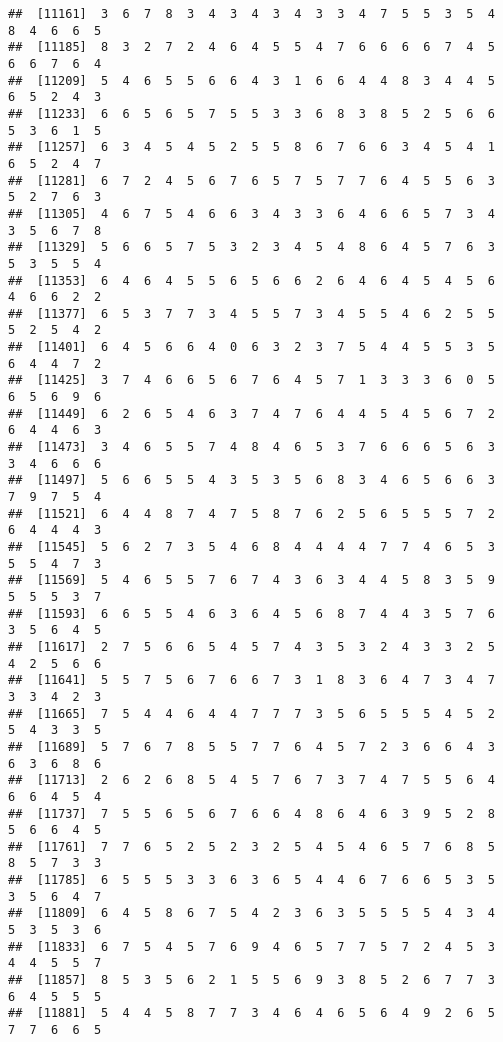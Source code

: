 \documentclass[
]{book}
\begin{document}
\begin{verbatim}
##  [11161]  3  6  7  8  3  4  3  4  3  4  3  3  4  7  5  5  3  5  4  8  4  6  6  5
##  [11185]  8  3  2  7  2  4  6  4  5  5  4  7  6  6  6  6  7  4  5  6  6  7  6  4
##  [11209]  5  4  6  5  5  6  6  4  3  1  6  6  4  4  8  3  4  4  5  6  5  2  4  3
##  [11233]  6  6  5  6  5  7  5  5  3  3  6  8  3  8  5  2  5  6  6  5  3  6  1  5
##  [11257]  6  3  4  5  4  5  2  5  5  8  6  7  6  6  3  4  5  4  1  6  5  2  4  7
##  [11281]  6  7  2  4  5  6  7  6  5  7  5  7  7  6  4  5  5  6  3  5  2  7  6  3
##  [11305]  4  6  7  5  4  6  6  3  4  3  3  6  4  6  6  5  7  3  4  3  5  6  7  8
##  [11329]  5  6  6  5  7  5  3  2  3  4  5  4  8  6  4  5  7  6  3  5  3  5  5  4
##  [11353]  6  4  6  4  5  5  6  5  6  6  2  6  4  6  4  5  4  5  6  4  6  6  2  2
##  [11377]  6  5  3  7  7  3  4  5  5  7  3  4  5  5  4  6  2  5  5  5  2  5  4  2
##  [11401]  6  4  5  6  6  4  0  6  3  2  3  7  5  4  4  5  5  3  5  6  4  4  7  2
##  [11425]  3  7  4  6  6  5  6  7  6  4  5  7  1  3  3  3  6  0  5  6  5  6  9  6
##  [11449]  6  2  6  5  4  6  3  7  4  7  6  4  4  5  4  5  6  7  2  6  4  4  6  3
##  [11473]  3  4  6  5  5  7  4  8  4  6  5  3  7  6  6  6  5  6  3  3  4  6  6  6
##  [11497]  5  6  6  5  5  4  3  5  3  5  6  8  3  4  6  5  6  6  3  7  9  7  5  4
##  [11521]  6  4  4  8  7  4  7  5  8  7  6  2  5  6  5  5  5  7  2  6  4  4  4  3
##  [11545]  5  6  2  7  3  5  4  6  8  4  4  4  4  7  7  4  6  5  3  5  5  4  7  3
##  [11569]  5  4  6  5  5  7  6  7  4  3  6  3  4  4  5  8  3  5  9  5  5  5  3  7
##  [11593]  6  6  5  5  4  6  3  6  4  5  6  8  7  4  4  3  5  7  6  3  5  6  4  5
##  [11617]  2  7  5  6  6  5  4  5  7  4  3  5  3  2  4  3  3  2  5  4  2  5  6  6
##  [11641]  5  5  7  5  6  7  6  6  7  3  1  8  3  6  4  7  3  4  7  3  3  4  2  3
##  [11665]  7  5  4  4  6  4  4  7  7  7  3  5  6  5  5  5  4  5  2  5  4  3  3  5
##  [11689]  5  7  6  7  8  5  5  7  7  6  4  5  7  2  3  6  6  4  3  6  3  6  8  6
##  [11713]  2  6  2  6  8  5  4  5  7  6  7  3  7  4  7  5  5  6  4  6  6  4  5  4
##  [11737]  7  5  5  6  5  6  7  6  6  4  8  6  4  6  3  9  5  2  8  5  6  6  4  5
##  [11761]  7  7  6  5  2  5  2  3  2  5  4  5  4  6  5  7  6  8  5  8  5  7  3  3
##  [11785]  6  5  5  5  3  3  6  3  6  5  4  4  6  7  6  6  5  3  5  3  5  6  4  7
##  [11809]  6  4  5  8  6  7  5  4  2  3  6  3  5  5  5  5  4  3  4  5  3  5  3  6
##  [11833]  6  7  5  4  5  7  6  9  4  6  5  7  7  5  7  2  4  5  3  4  4  5  5  7
##  [11857]  8  5  3  5  6  2  1  5  5  6  9  3  8  5  2  6  7  7  3  6  4  5  5  5
##  [11881]  5  4  4  5  8  7  7  3  4  6  4  6  5  6  4  9  2  6  5  7  7  6  6  5

\end{verbatim}
\end{document}
